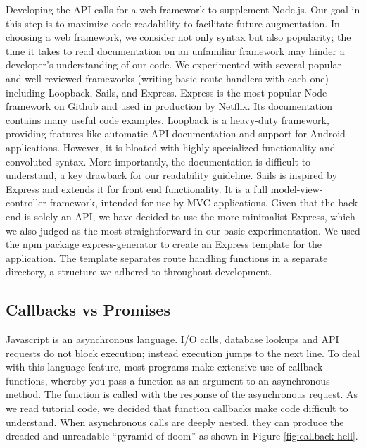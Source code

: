 \documentclass[pageno]{jpaper}
\begin{document}
Developing the API calls for a web framework to supplement Node.js. Our goal in this step is to maximize code readability to facilitate future augmentation. In choosing a web framework, we consider not only syntax but also popularity; the time it takes to read documentation on an unfamiliar framework may hinder a developer's understanding of our code. We experimented with several popular and well-reviewed frameworks (writing basic route handlers with each one) including Loopback, Sails, and Express. Express is the most popular Node framework on Github and used in production by Netflix. Its documentation contains many useful code examples. Loopback is a heavy-duty framework, providing features like automatic API documentation and support for Android applications. However, it is bloated with highly specialized functionality and convoluted syntax. More importantly, the documentation is difficult to understand, a key drawback for our readability guideline. Sails is inspired by Express and extends it for front end functionality. It is a full model-view-controller framework, intended for use by MVC applications. Given that the back end is solely an API, we have decided to use the more minimalist Express, which we also judged as the most straightforward in our basic experimentation. We used the npm package express-generator to create an Express template for the application. The template separates route handling functions in a separate directory, a structure we adhered to throughout development.

\subsection{Callbacks vs Promises} 
Javascript is an asynchronous language. I/O calls, database lookups and API requests do not block execution; instead execution jumps to the next line. To deal with this language feature, most programs make extensive use of callback functions, whereby you pass a function as an argument to an asynchronous method. The function is called with the response of the asynchronous request. As we read tutorial code, we decided that function callbacks make code difficult to understand. When asynchronous calls are deeply nested, they can produce the dreaded and unreadable ``pyramid of doom'' as shown in Figure \ref{fig:callback-hell}.
\end{document}
